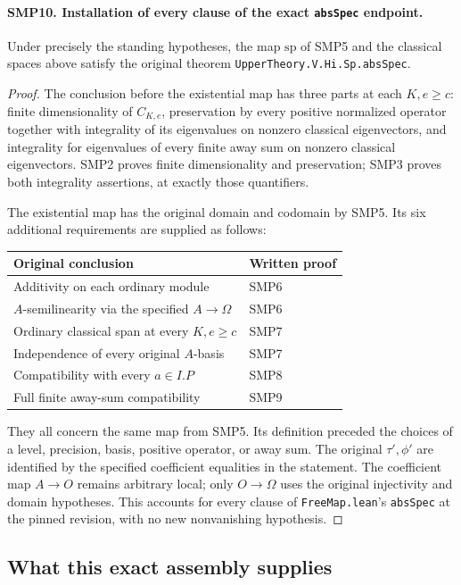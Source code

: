 \paragraph{SMP10. Installation of every clause of the exact \texttt{absSpec} endpoint.}
\label{claim:SMP10}
Under precisely the standing hypotheses, the map
$\mathrm{sp}$ of SMP5 and the classical spaces above
satisfy the original theorem
\texttt{UpperTheory.V.Hi.Sp.absSpec}.
\begin{proof}
The conclusion before the existential map has three
parts at each $K,e\geq c$: finite dimensionality of
$C_{K,e}$, preservation by every positive normalized
operator together with integrality of its eigenvalues
on nonzero classical eigenvectors, and integrality
for eigenvalues of every finite away sum on nonzero
classical eigenvectors.  SMP2 proves finite
dimensionality and preservation; SMP3 proves both
integrality assertions, at exactly those quantifiers.

The existential map has the original domain and
codomain by SMP5.  Its six additional requirements
are supplied as follows:
\begin{center}
\begin{tabular}{ll}
Original conclusion & Written proof \\
\hline
Additivity on each ordinary module & SMP6 \\
$A$-semilinearity via the specified $A\to\Omega$ & SMP6 \\
Ordinary classical span at every $K,e\geq c$ & SMP7 \\
Independence of every original $A$-basis & SMP7 \\
Compatibility with every $a\in I.P$ & SMP8 \\
Full finite away-sum compatibility & SMP9
\end{tabular}
\end{center}
They all concern the same map from SMP5.  Its definition
preceded the choices of a level, precision, basis,
positive operator, or away sum.  The original
$\tau',\phi'$ are identified by the specified
coefficient equalities in the statement.  The
coefficient map $A\to O$ remains arbitrary local;
only $O\to\Omega$ uses the original injectivity and
domain hypotheses.  This accounts for every clause
of \texttt{FreeMap.lean}'s \texttt{absSpec} at the
pinned revision, with no new nonvanishing hypothesis.
\end{proof}

\subsection{What this exact assembly supplies}

